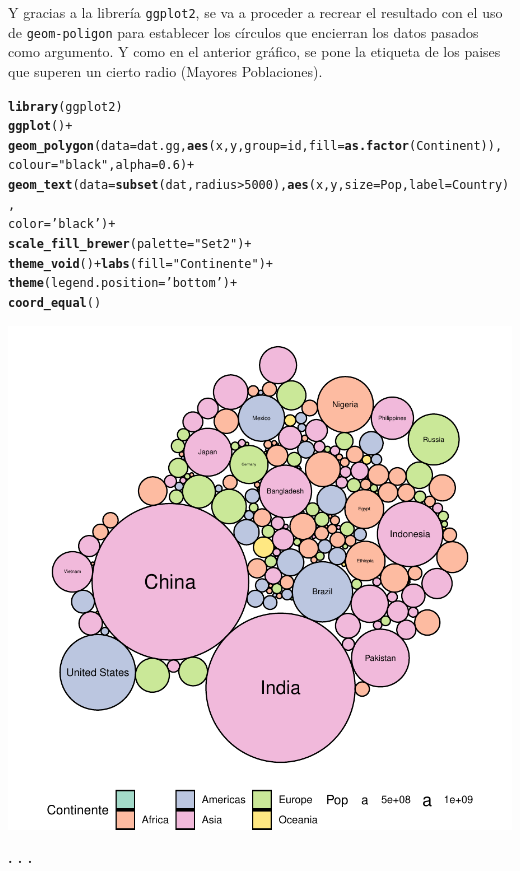 \documentclass{article}\usepackage[]{graphicx}\usepackage[]{color}
\makeatletter
\def\maxwidth{ %
  \ifdim\Gin@nat@width>\linewidth
    \linewidth
  \else
    \Gin@nat@width
  \fi
}
\newcommand{\hlnum}[1]{\textcolor[rgb]{0.686,0.059,0.569}{#1}}%
\newcommand{\hlstr}[1]{\textcolor[rgb]{0.192,0.494,0.8}{#1}}%
\newcommand{\hlopt}[1]{\textcolor[rgb]{0,0,0}{#1}}%
\newcommand{\hlstd}[1]{\textcolor[rgb]{0.345,0.345,0.345}{#1}}%
\newcommand{\hlkwc}[1]{\textcolor[rgb]{0.333,0.667,0.333}{#1}}%
\newcommand{\hlkwd}[1]{\textcolor[rgb]{0.737,0.353,0.396}{\textbf{#1}}}%
\newenvironment{kframe}{%
 \def\at@end@of@kframe{}%
 \ifinner\ifhmode%
  \def\at@end@of@kframe{\end{minipage}}%
  \begin{minipage}{\columnwidth}%
 \fi\fi%
 \def\FrameCommand##1{\hskip\@totalleftmargin \hskip-\fboxsep
 \colorbox{shadecolor}{##1}\hskip-\fboxsep
     \hskip-\linewidth \hskip-\@totalleftmargin \hskip\columnwidth}%
 \MakeFramed {\advance\hsize-\width
   \@totalleftmargin\z@ \linewidth\hsize
   \@setminipage}}%
 {\par\unskip\endMakeFramed%
 \at@end@of@kframe}
\newenvironment{knitrout}{}{} %
\makeatother
\begin{document}
Y gracias a la librer\'ia \texttt{ggplot2}, se va a proceder a recrear el resultado con el uso de \texttt{geom-poligon} para establecer los c\'irculos que encierran los datos pasados como argumento. Y como en el anterior gr\'afico, se pone la etiqueta de los paises que superen un cierto radio (Mayores Poblaciones).
\begin{knitrout}
\color{fgcolor}\begin{kframe}
\begin{alltt}
\hlkwd{library}\hlstd{(ggplot2)}
\hlkwd{ggplot}\hlstd{()} \hlopt{+}
  \hlkwd{geom_polygon}\hlstd{(}\hlkwc{data} \hlstd{= dat.gg,} \hlkwd{aes}\hlstd{(x, y,} \hlkwc{group} \hlstd{= id,} \hlkwc{fill}\hlstd{=}\hlkwd{as.factor}\hlstd{(Continent)),}
               \hlkwc{colour} \hlstd{=} \hlstr{"black"}\hlstd{,} \hlkwc{alpha} \hlstd{=} \hlnum{0.6}\hlstd{)} \hlopt{+}
  \hlkwd{geom_text}\hlstd{(}\hlkwc{data} \hlstd{=} \hlkwd{subset}\hlstd{(dat, radius} \hlopt{>} \hlnum{5000}\hlstd{),} \hlkwd{aes}\hlstd{(x, y,} \hlkwc{size}\hlstd{=Pop,} \hlkwc{label} \hlstd{= Country),}
            \hlkwc{color} \hlstd{=} \hlstr{'black'}\hlstd{)} \hlopt{+}
  \hlkwd{scale_fill_brewer}\hlstd{(}\hlkwc{palette} \hlstd{=} \hlstr{"Set2"}\hlstd{)} \hlopt{+}
  \hlkwd{theme_void}\hlstd{()} \hlopt{+} \hlkwd{labs}\hlstd{(}\hlkwc{fill} \hlstd{=} \hlstr{"Continente"}\hlstd{)} \hlopt{+}
  \hlkwd{theme}\hlstd{(}\hlkwc{legend.position}\hlstd{=}\hlstr{'bottom'}\hlstd{)} \hlopt{+}
  \hlkwd{coord_equal}\hlstd{()}
\end{alltt}
\end{kframe}

{\centering \includegraphics[width=\maxwidth]{figure/plot_bu-1} 

}



\end{knitrout}
\begin{center}
\textbf{. . .}
\end{center}
\end{document}
